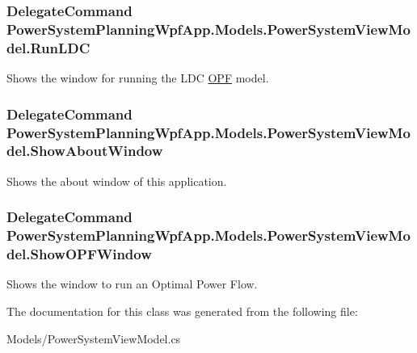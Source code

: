 \subsubsection[{\texorpdfstring{Run\+L\+DC}{RunLDC}}]{\setlength{\rightskip}{0pt plus 5cm}Delegate\+Command Power\+System\+Planning\+Wpf\+App.\+Models.\+Power\+System\+View\+Model.\+Run\+L\+DC\hspace{0.3cm}{\ttfamily [get]}}\hypertarget{class_power_system_planning_wpf_app_1_1_models_1_1_power_system_view_model_a823b557451c5d1919795bd7f66cae55f}{}\label{class_power_system_planning_wpf_app_1_1_models_1_1_power_system_view_model_a823b557451c5d1919795bd7f66cae55f}


Shows the window for running the L\+DC \hyperlink{namespace_power_system_planning_wpf_app_1_1_o_p_f}{O\+PF} model. 

\subsubsection[{\texorpdfstring{Show\+About\+Window}{ShowAboutWindow}}]{\setlength{\rightskip}{0pt plus 5cm}Delegate\+Command Power\+System\+Planning\+Wpf\+App.\+Models.\+Power\+System\+View\+Model.\+Show\+About\+Window\hspace{0.3cm}{\ttfamily [get]}}\hypertarget{class_power_system_planning_wpf_app_1_1_models_1_1_power_system_view_model_a18f9d1046adb9bfd67bcdc5c07cfcc2b}{}\label{class_power_system_planning_wpf_app_1_1_models_1_1_power_system_view_model_a18f9d1046adb9bfd67bcdc5c07cfcc2b}


Shows the about window of this application. 

\subsubsection[{\texorpdfstring{Show\+O\+P\+F\+Window}{ShowOPFWindow}}]{\setlength{\rightskip}{0pt plus 5cm}Delegate\+Command Power\+System\+Planning\+Wpf\+App.\+Models.\+Power\+System\+View\+Model.\+Show\+O\+P\+F\+Window\hspace{0.3cm}{\ttfamily [get]}}\hypertarget{class_power_system_planning_wpf_app_1_1_models_1_1_power_system_view_model_a1a0b9565c51f953742c9ce376eaa1f88}{}\label{class_power_system_planning_wpf_app_1_1_models_1_1_power_system_view_model_a1a0b9565c51f953742c9ce376eaa1f88}


Shows the window to run an Optimal Power Flow. 



The documentation for this class was generated from the following file\+:\begin{DoxyCompactItemize}
\item 
Models/Power\+System\+View\+Model.\+cs\end{DoxyCompactItemize}
